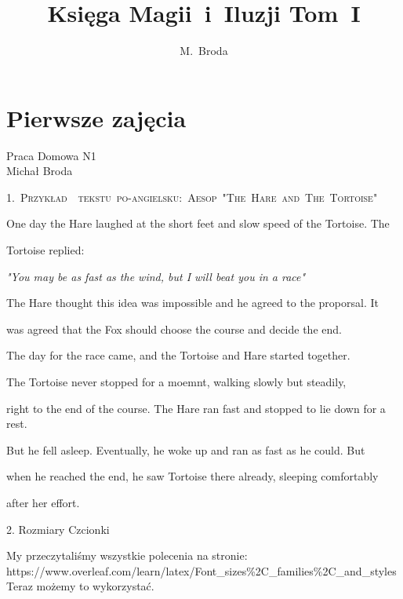 \documentclass[a4paper,15pt]{book}
\author{M.~Broda}
\title{Księga Magii~i~Iluzji Tom~I}
\begin{document}
\pagestyle{plain}
\maketitle
\thispagestyle{empty}
\tableofcontents
\part{Pierwsze zajęcia}
\begin{center}Praca Domowa N1 \\

Michał Broda \\

\end{center}
\scshape
\small 
1.~Przykład~~tekstu~po-angielsku:~Aesop~"The~Hare~and~The~Tortoise"

\upshape

One day the Hare laughed at the short feet and slow speed of the Tortoise. The

Tortoise replied:

\textit{"You may be as fast as the wind, but I will beat you in a race"}

The Hare thought this idea was impossible and he agreed to the proporsal. It

was agreed that the Fox should choose the course and decide the end.

The day for the race came, and the Tortoise and Hare started together.

The Tortoise never stopped for a moemnt, walking slowly but steadily,

right to the end of the course. The Hare ran fast and stopped to lie down for a rest.

But he fell asleep. Eventually, he woke up and ran as fast as he could. But

when he reached the end, he saw Tortoise there already, sleeping comfortably

after her effort.

\begin{center}
2. Rozmiary Czcionki \\

\end{center}
My przeczytaliśmy wszystkie polecenia na stronie: \\

https://www.overleaf.com/learn/latex/Font\_sizes\%2C\_families\%2C\_and\_styles \\

Teraz możemy to wykorzystać. \\
\end{document}
